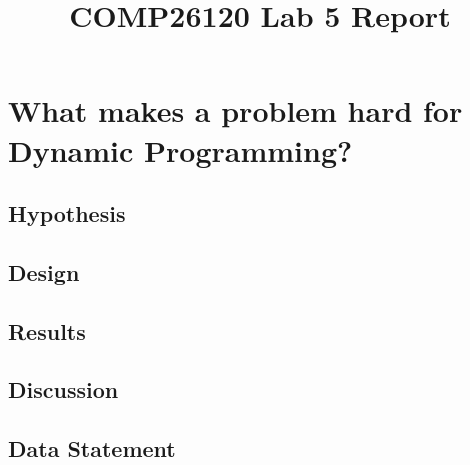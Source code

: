 \documentclass[a4]{article}
\title{COMP26120 Lab 5 Report}
\author{}
\begin{document}
\maketitle

\section{What makes a problem hard for Dynamic Programming?}

\subsection{Hypothesis}
\subsection{Design}
\subsection{Results}
\subsection{Discussion}
\subsection{Data Statement}


\appendix

\end{document}
